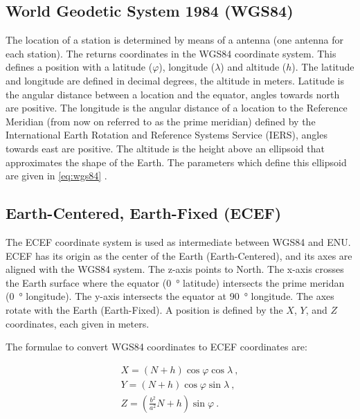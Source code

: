 \subsection{World Geodetic System 1984 (WGS84)}

The location of a \hisparc station is determined by means of a \gps
antenna (one antenna for each station). The \gps returns coordinates in
the WGS84 coordinate system. This defines a position with a latitude
($\varphi$), longitude ($\lambda$) and altitude ($h$). The latitude and
longitude are defined in decimal degrees, the altitude in meters.
Latitude is the angular distance between a location and the equator,
angles towards north are positive. The longitude is the angular distance
of a location to the Reference Meridian (from now on referred to as the
prime meridian) defined by the International Earth Rotation and
Reference Systems Service (IERS), angles towards east are positive. The
altitude is the height above an ellipsoid that approximates the shape of
the Earth. The parameters which define this ellipsoid are given in
\eqref{eq:wgs84} \cite{nga:2014aa}.


\subsection{Earth-Centered, Earth-Fixed (ECEF)}

The ECEF coordinate system is used as intermediate between WGS84 and
ENU. ECEF has its origin as the center of the Earth (Earth-Centered),
and its axes are aligned with the WGS84 system. The z-axis points to
North. The x-axis crosses the Earth surface where the equator
(\SI{0}{\degree} latitude) intersects the prime meridan (\SI{0}{\degree}
longitude). The y-axis intersects the equator at \SI{90}{\degree}
longitude. The axes rotate with the Earth (Earth-Fixed). A position is
defined by the $X$, $Y$, and $Z$ coordinates, each given in meters.

The formulae to convert WGS84 coordinates to ECEF coordinates are:

\begin{equation}
    \begin{array}{l}
        X = \left(N + h\right) \cos{\varphi} \cos{\lambda} \ , \\
        Y = \left(N + h\right) \cos{\varphi} \sin{\lambda} \ , \\
        Z = \left(\frac{b^2}{a^2} N + h\right) \sin{\varphi} \ .
    \end{array}
\end{equation}

